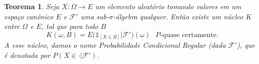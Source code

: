\documentclass[reqno, draft]{book}
\newcommand*\1{\mathds{1}}
\newtheorem{theorem}{Teorema}[section]
\begin{document}

\begin{theorem}
  \label{t:prob_cond_reg_F}
  Seja $X: \Omega \to E$ um elemento aleatório tomando valores em um espaço canônico $E$ e $\mathcal{F}'$ uma sub-$\sigma$-álgebra qualquer.
  Então existe um núcleo $K$ entre $\Omega$ e $E$, tal que para todo $B$
  \begin{equation}
    K(\omega, B) = E\big(\1_{[X \in B]} | \mathcal{F}'\big) (\omega) \text{ $P$-quase certamente.}
  \end{equation}
  A esse núcleo, damos o nome Probabilidade Condicional Regular (dada $\mathcal{F}'$), que é denotada por $P(X \in \cdot|\mathcal{F}')$.
\end{theorem}

\end{document}
